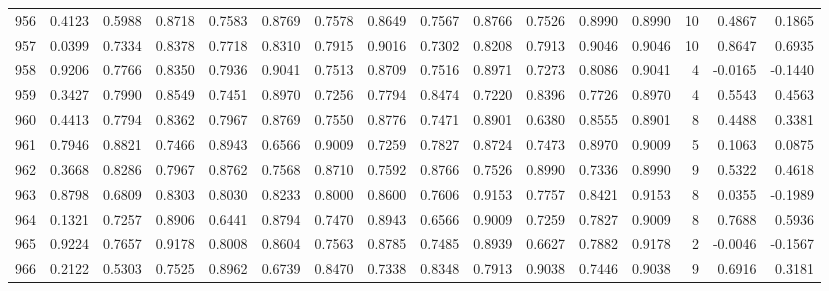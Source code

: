 \begin{tabular}{lrrrrrrrrrrrrrrr}
956 &      0.4123 &  0.5988 &  0.8718 &  0.7583 &  0.8769 &  0.7578 &  0.8649 &  0.7567 &  0.8766 &  0.7526 &   0.8990 &     0.8990 &     10 &                    0.4867 &                     0.1865 \\
957 &      0.0399 &  0.7334 &  0.8378 &  0.7718 &  0.8310 &  0.7915 &  0.9016 &  0.7302 &  0.8208 &  0.7913 &   0.9046 &     0.9046 &     10 &                    0.8647 &                     0.6935 \\
958 &      0.9206 &  0.7766 &  0.8350 &  0.7936 &  0.9041 &  0.7513 &  0.8709 &  0.7516 &  0.8971 &  0.7273 &   0.8086 &     0.9041 &      4 &                   -0.0165 &                    -0.1440 \\
959 &      0.3427 &  0.7990 &  0.8549 &  0.7451 &  0.8970 &  0.7256 &  0.7794 &  0.8474 &  0.7220 &  0.8396 &   0.7726 &     0.8970 &      4 &                    0.5543 &                     0.4563 \\
960 &      0.4413 &  0.7794 &  0.8362 &  0.7967 &  0.8769 &  0.7550 &  0.8776 &  0.7471 &  0.8901 &  0.6380 &   0.8555 &     0.8901 &      8 &                    0.4488 &                     0.3381 \\
961 &      0.7946 &  0.8821 &  0.7466 &  0.8943 &  0.6566 &  0.9009 &  0.7259 &  0.7827 &  0.8724 &  0.7473 &   0.8970 &     0.9009 &      5 &                    0.1063 &                     0.0875 \\
962 &      0.3668 &  0.8286 &  0.7967 &  0.8762 &  0.7568 &  0.8710 &  0.7592 &  0.8766 &  0.7526 &  0.8990 &   0.7336 &     0.8990 &      9 &                    0.5322 &                     0.4618 \\
963 &      0.8798 &  0.6809 &  0.8303 &  0.8030 &  0.8233 &  0.8000 &  0.8600 &  0.7606 &  0.9153 &  0.7757 &   0.8421 &     0.9153 &      8 &                    0.0355 &                    -0.1989 \\
964 &      0.1321 &  0.7257 &  0.8906 &  0.6441 &  0.8794 &  0.7470 &  0.8943 &  0.6566 &  0.9009 &  0.7259 &   0.7827 &     0.9009 &      8 &                    0.7688 &                     0.5936 \\
965 &      0.9224 &  0.7657 &  0.9178 &  0.8008 &  0.8604 &  0.7563 &  0.8785 &  0.7485 &  0.8939 &  0.6627 &   0.7882 &     0.9178 &      2 &                   -0.0046 &                    -0.1567 \\
966 &      0.2122 &  0.5303 &  0.7525 &  0.8962 &  0.6739 &  0.8470 &  0.7338 &  0.8348 &  0.7913 &  0.9038 &   0.7446 &     0.9038 &      9 &                    0.6916 &                     0.3181 \\

\end{tabular}
